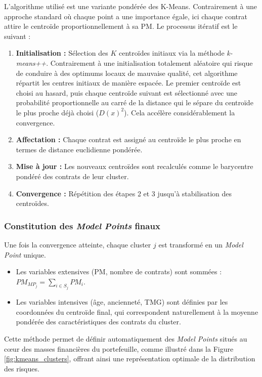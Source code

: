 L'algorithme utilisé est une variante pondérée des K-Means. Contrairement à une approche standard où chaque point a une importance égale, ici chaque contrat attire le centroïde proportionnellement à sa PM. Le processus itératif est le suivant :
\begin{enumerate}
    \item \textbf{Initialisation :} Sélection des $K$ centroïdes initiaux via la méthode \textit{k-means++}. Contrairement à une initialisation totalement aléatoire qui risque de conduire à des optimums locaux de mauvaise qualité, cet algorithme répartit les centres initiaux de manière espacée. Le premier centroïde est choisi au hasard, puis chaque centroïde suivant est sélectionné avec une probabilité proportionnelle au carré de la distance qui le sépare du centroïde le plus proche déjà choisi ($D(x)^2$). Cela accélère considérablement la convergence.
    \item \textbf{Affectation :} Chaque contrat est assigné au centroïde le plus proche en termes de distance euclidienne pondérée.
    \item \textbf{Mise à jour :} Les nouveaux centroïdes sont recalculés comme le barycentre pondéré des contrats de leur cluster.
    \item \textbf{Convergence :} Répétition des étapes 2 et 3 jusqu'à stabilisation des centroïdes.
\end{enumerate}

\subsubsection{Constitution des \textit{Model Points} finaux}
Une fois la convergence atteinte, chaque cluster $j$ est transformé en un \textit{Model Point} unique.
\begin{itemize}
    \item Les variables extensives (PM, nombre de contrats) sont sommées : $PM_{MP_j} = \sum_{i \in S_j} PM_i$.
    \item Les variables intensives (âge, ancienneté, TMG) sont définies par les coordonnées du centroïde final, qui correspondent naturellement à la moyenne pondérée des caractéristiques des contrats du cluster.
\end{itemize}

Cette méthode permet de définir automatiquement des \textit{Model Points} situés au cœur des masses financières du portefeuille, comme illustré dans la Figure \ref{fig:kmeans_clusters}, offrant ainsi une représentation optimale de la distribution des risques.

